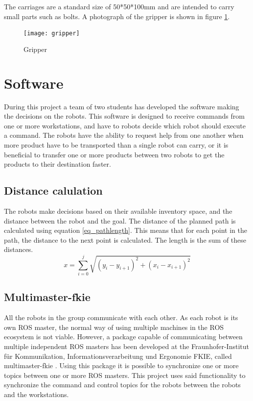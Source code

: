 \documentclass[10pt, journal]{IEEEtran}
\begin{document}
The carriages are a standard size of 50*50*100mm and are intended to carry small parts such as bolts. A photograph of the gripper is shown in figure \ref{Gripper}.
\begin{figure}[htp]
\centering
\texttt{[image: gripper]}
\caption{Gripper}
\label{Gripper}
\end{figure}

\section{Software}
During this project a team of two students has developed the software making the decisions on the robots. This software is designed to receive commands from one or more workstations, and have to robots decide which robot should execute a command. The robots have the ability to request help from one another when more product have to be transported than a single robot can carry, or it is beneficial to transfer one or more products between two robots to get the products to their destination faster.

\subsection{Distance calulation}
The robots make decisions based on their available inventory space, and the distance between the robot and the goal. The distance of the planned path is calculated using equation \ref{eq_pathlength}. This means that for each point in the path, the distance to the next point is calculated. The length is the sum of these distances.
\begin{equation}
\label{eq_pathlength}
x = \sum\limits_{i=0}^j \sqrt{(y_i - y_{i+1})^2 + (x_i - x_{i+1})^2}
\end{equation}

\subsection{Multimaster-fkie}
All the robots in the group communicate with each other. As each robot is its own ROS master, the normal\cite{ROSMultipleMachines} way of using multiple machines in the ROS ecosystem is not viable. However, a package capable of communicating between multiple independent ROS masters has been developed at the Fraunhofer-Institut f{\"u}r Kommunikation, Informationsverarbeitung und Ergonomie FKIE, called multimaster-fkie \cite{Multimaster-fkie}. Using this package it is possible to synchronize one or more topics between one or more ROS masters. This project uses said functionality to synchronize the command and control topics for the robots between the robots and the workstations.
\end{document}
